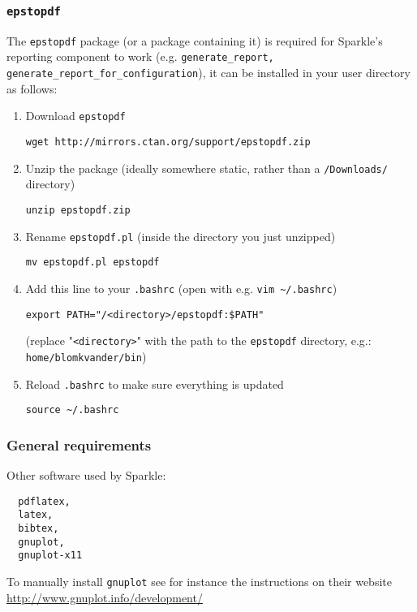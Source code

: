 \documentclass{article}
\begin{document}
\subsubsection{\texttt{epstopdf}}
\label{package:epstopdf}

The \texttt{epstopdf} package (or a package containing it) is required for Sparkle's reporting component to work (e.g. \texttt{generate\_report, generate\_report\_for\_configuration}), it can be installed in your user directory as follows:

\begin{enumerate}
  \item Download \texttt{epstopdf}

  \texttt{wget http://mirrors.ctan.org/support/epstopdf.zip}

  \item Unzip the package (ideally somewhere static, rather than a \texttt{/Downloads/} directory)

  \texttt{unzip epstopdf.zip}

  \item Rename \texttt{epstopdf.pl} (inside the directory you just unzipped)

  \texttt{mv epstopdf.pl epstopdf}

  \item Add this line to your \texttt{.bashrc} (open with e.g. \texttt{vim \~{}/.bashrc})

  \texttt{export PATH="/<directory>/epstopdf:\$PATH"}

  (replace "\texttt{<directory>}" with the path to the \texttt{epstopdf} directory, e.g.: \texttt{home/blomkvander/bin})

  \item Reload \texttt{.bashrc} to make sure everything is updated

  \texttt{source \textasciitilde/.bashrc}
\end{enumerate}

\subsubsection{General requirements}
Other software used by Sparkle:

\begin{verbatim}
  pdflatex,
  latex,
  bibtex,
  gnuplot,
  gnuplot-x11
\end{verbatim}

To manually install \texttt{gnuplot} see for instance the instructions on their website \url{http://www.gnuplot.info/development/}
\end{document}
